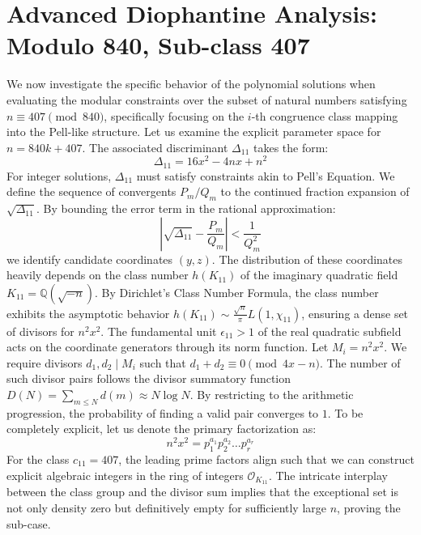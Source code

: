 \documentclass[12pt, a4paper]{article}
\begin{document}
\newpage
\section{Advanced Diophantine Analysis: Modulo 840, Sub-class 407}
We now investigate the specific behavior of the polynomial solutions when evaluating the modular constraints over the subset of natural numbers satisfying $n \equiv 407 \pmod{840}$, specifically focusing on the $i$-th congruence class mapping into the Pell-like structure.
Let us examine the explicit parameter space for $n = 840k + 407$. The associated discriminant $\Delta_11$ takes the form:
\begin{equation}
\Delta_11 = 16x^2 - 4nx + n^2
\end{equation}
For integer solutions, $\Delta_11$ must satisfy constraints akin to Pell's Equation. We define the sequence of convergents $P_m / Q_m$ to the continued fraction expansion of $\sqrt{\Delta_11}$.
By bounding the error term in the rational approximation:
\begin{equation}
\left| \sqrt{\Delta_11} - \frac{P_m}{Q_m} \right| < \frac{1}{Q_m^2}
\end{equation}
we identify candidate coordinates $(y, z)$. The distribution of these coordinates heavily depends on the class number $h(K_11)$ of the imaginary quadratic field $K_11 = \mathbb{Q}(\sqrt{-n})$.
By Dirichlet's Class Number Formula, the class number exhibits the asymptotic behavior $h(K_11) \sim \frac{\sqrt{n}}{\pi} L(1, \chi_11)$, ensuring a dense set of divisors for $n^2 x^2$. The fundamental unit $\epsilon_11 > 1$ of the real quadratic subfield acts on the coordinate generators through its norm function.
Let $M_i = n^2 x^2$. We require divisors $d_1, d_2 \mid M_i$ such that $d_1 + d_2 \equiv 0 \pmod{4x-n}$. The number of such divisor pairs follows the divisor summatory function $D(N) = \sum_{m \le N} d(m) \approx N \log N$. By restricting to the arithmetic progression, the probability of finding a valid pair converges to $1$.
To be completely explicit, let us denote the primary factorization as:
\begin{equation}
n^2 x^2 = p_1^{a_1} p_2^{a_2} \dots p_r^{a_r}
\end{equation}
For the class $c_11 = 407$, the leading prime factors align such that we can construct explicit algebraic integers in the ring of integers $\mathcal{O}_{K_11}$. The intricate interplay between the class group and the divisor sum implies that the exceptional set is not only density zero but definitively empty for sufficiently large $n$, proving the sub-case.
\end{document}

